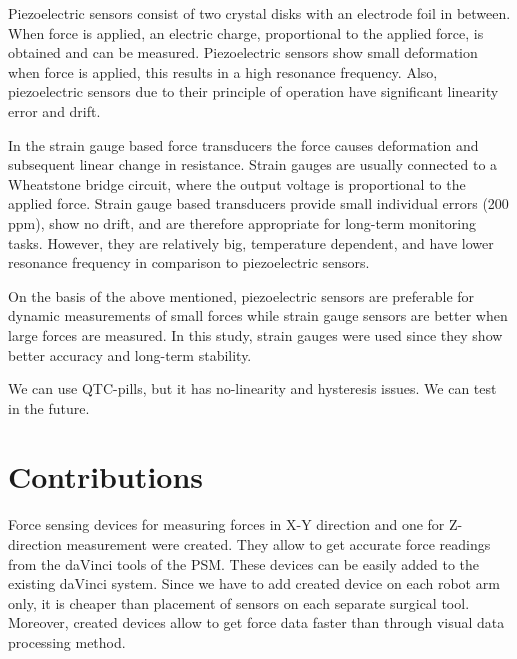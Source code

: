 Piezoelectric sensors consist of two crystal disks with an electrode foil in between. When force is applied, an electric charge, proportional to the applied force, is obtained and can be measured. Piezoelectric sensors show small deformation when force is applied, this results in a high resonance frequency. Also, piezoelectric sensors due to their principle of operation have significant linearity error and drift. \cite{SGandP2}

In the strain gauge based force transducers the force causes deformation and subsequent linear change in resistance. Strain gauges are usually connected to a Wheatstone bridge circuit, where the output voltage is proportional to the applied force. Strain gauge based transducers provide small individual errors (200 ppm), show no drift, and are therefore appropriate for long-term monitoring tasks. However, they are relatively big, temperature dependent, and have lower resonance frequency in comparison to piezoelectric sensors. \cite{SGandP1,SGandP2}

On the basis of the above mentioned, piezoelectric sensors are preferable for dynamic measurements of small forces while strain gauge sensors are better when large forces are measured. In this study, strain gauges were used since they show better accuracy and long-term stability. \cite{SGandP1,SGandP2}

We can use QTC-pills, but it has no-linearity and hysteresis issues. We can test in the future.


\section{Contributions}
\label{sec:MyAppr}
Force sensing devices for measuring forces in X-Y direction and one for Z-direction measurement were created. They allow to get accurate force readings from the daVinci tools of the PSM.  These devices can be easily added to the existing daVinci system. Since we have to add created device on each robot arm only, it is cheaper than placement of sensors on each separate surgical tool.  Moreover, created devices allow to get force data faster than through visual data processing method. 
